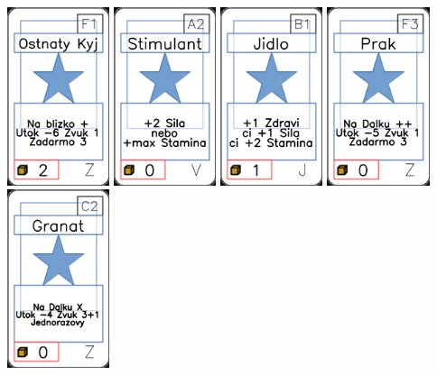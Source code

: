 \documentclass[a4paper]{article}
\begin{document}
	\includegraphics[width=3.0cm]{img-1_85}
	\includegraphics[width=3.0cm]{img-1_61}
	\includegraphics[width=3.0cm]{img-1_5}
	\includegraphics[width=3.0cm]{img-1_87}
	\includegraphics[width=3.0cm]{img-1_101}
\end{document}
